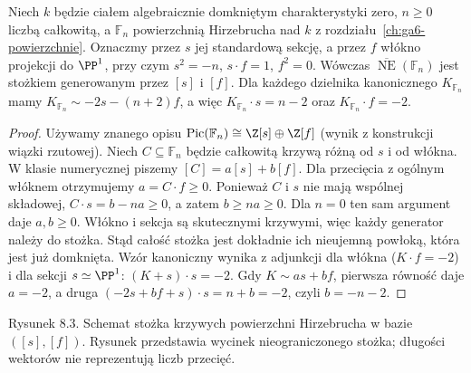 \begin{stwierdzenie}
\label{st:ga8-fn-cone}
Niech $k$ będzie ciałem algebraicznie domkniętym
charakterystyki zero, $n\ge0$ liczbą całkowitą, a
$\mathbb F_n$ powierzchnią Hirzebrucha nad $k$
z rozdziału~\ref{ch:ga6-powierzchnie}.
Oznaczmy przez $s$ jej standardową sekcję, a przez $f$
włókno projekcji do $\PP^1$, przy czym
$s^2=-n$, $s\cdot f=1$, $f^2=0$.
Wówczas $\overline{\operatorname{NE}}(\mathbb F_n)$
jest stożkiem generowanym przez $[s]$ i $[f]$.
Dla każdego dzielnika kanonicznego $K_{\mathbb F_n}$
mamy $K_{\mathbb F_n}\sim-2s-(n+2)f$,
a więc $K_{\mathbb F_n}\cdot s=n-2$ oraz
$K_{\mathbb F_n}\cdot f=-2$.
\end{stwierdzenie}
\begin{proof}
Używamy znanego opisu $\operatorname{Pic}(\mathbb F_n)
\cong\Z[s]\oplus\Z[f]$ (wynik z konstrukcji
wiązki rzutowej). Niech $C\subseteq\mathbb F_n$
będzie całkowitą krzywą różną od $s$ i od włókna.
W klasie numerycznej piszemy $[C]=a[s]+b[f]$.
Dla przecięcia z ogólnym włóknem otrzymujemy
$a=C\cdot f\ge0$. Ponieważ $C$ i $s$ nie mają
wspólnej składowej, $C\cdot s=b-na\ge0$,
a zatem $b\ge na\ge0$. Dla $n=0$ ten sam argument
daje $a,b\ge0$. Włókno i sekcja są skutecznymi
krzywymi, więc każdy generator należy do stożka.
Stąd całość stożka jest dokładnie ich nieujemną
powłoką, która jest już domknięta.
Wzór kanoniczny wynika z adjunkcji dla włókna
($K\cdot f=-2$) i dla sekcji $s\simeq\PP^1$:
$(K+s)\cdot s=-2$. Gdy $K\sim as+bf$, pierwsza
równość daje $a=-2$, a druga $(-2s+bf+s)\cdot s
=n+b=-2$, czyli $b=-n-2$.
\end{proof}

\begin{center}

{\small Rysunek 8.3. Schemat stożka krzywych powierzchni
Hirzebrucha w bazie $([s],[f])$. Rysunek przedstawia
wycinek nieograniczonego stożka; długości wektorów
nie reprezentują liczb przecięć.}\par
\end{center}

